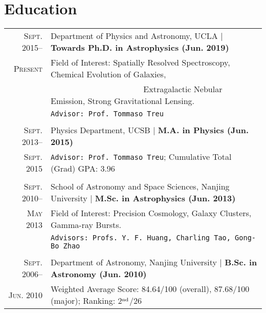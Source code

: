 \documentclass[letterpaper,10pt]{article}
\begin{document}
\section{Education}
\begin{tabular}{r|p{6.5in}}
  \textsc{Sept. 2015}--      &   Department of Physics and Astronomy, UCLA    |   \textbf{Towards Ph.D. in Astrophysics (Jun. 2019)}   \\
  \textsc{Present}
  & Field of Interest: Spatially Resolved Spectroscopy, Chemical Evolution of 
  Galaxies, \\ 
  & ~~~~~~~~~~~~~~~~~~~~~~ Extragalactic Nebular Emission, Strong Gravitational Lensing. \\
  &   \texttt{Advisor: Prof. Tommaso Treu}     \\
  \multicolumn{2}{c}{} \\
  \textsc{Sept. 2013}--      &   Physics Department, UCSB    |   \textbf{M.A. in Physics (Jun. 2015)}   \\
  \textsc{Sept. 2015}
  &   \texttt{Advisor: Prof. Tommaso Treu}; \quad Cumulative Total (Grad) GPA: 3.96     \\
  \multicolumn{2}{c}{} \\
  \textsc{Sept. 2010}--     &   School of Astronomy and Space Sciences, Nanjing University  |  \textbf{M.Sc. in Astrophysics (Jun. 2013)}   \\
  \textsc{May 2013}
  & Field of Interest: Precision Cosmology, Galaxy Clusters, Gamma-ray Bursts. \\
  & \texttt{Advisors: Profs. Y. F. Huang, Charling Tao, Gong-Bo Zhao}   \\
  \multicolumn{2}{c}{} \\
  \textsc{Sept. 2006}--     &   Department of Astronomy, Nanjing University  |  \textbf{B.Sc. in Astronomy (Jun. 2010)}    \\
  \textsc{Jun. 2010}       &   Weighted Average Score: 84.64/100 (overall), 87.68/100 (major); Ranking: 2$^{\rm nd}$/26  \\
\end{tabular}

\vspace{1em}
\end{document}
